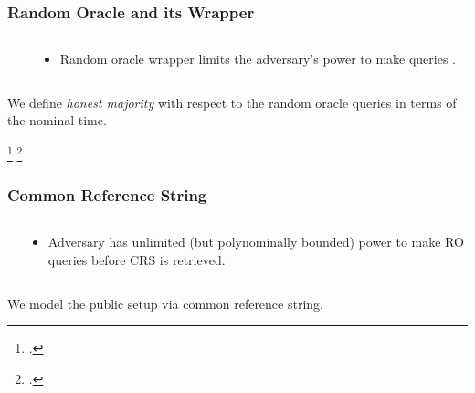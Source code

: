 \begin{frame}
    \frametitle{Random Oracle and its Wrapper}

    \begin{columns}[c, onlytextwidth]
        \begin{column}{0.6\textwidth} \centering {} \end{column}
        \begin{column}{0.4\textwidth}
            \begin{itemize}
                \item Random oracle wrapper limits the adversary's power to make queries \cite{bitcoin-uc-analysis,resource-restricted-mpc}.
            \end{itemize}
        \end{column}
    \end{columns}

    \begin{center}
        We define \emph{honest majority} with respect to the random oracle queries in terms of the nominal time.
    \end{center}

    \footcite{bitcoin-uc-analysis}
    \footcite{resource-restricted-mpc}
\end{frame}

\begin{frame}
    \frametitle{Common Reference String}

    \begin{columns}[c, onlytextwidth]
        \begin{column}{0.6\textwidth} \centering {} \end{column}
        \begin{column}{0.4\textwidth}
            \begin{itemize}
                \item Adversary has unlimited (but polynominally bounded) power to make RO queries before CRS is retrieved.
            \end{itemize}
        \end{column}
    \end{columns}

    \begin{center}
        We model the public setup via common reference string.
    \end{center}
    \vspace*{2.7em}
\end{frame}
